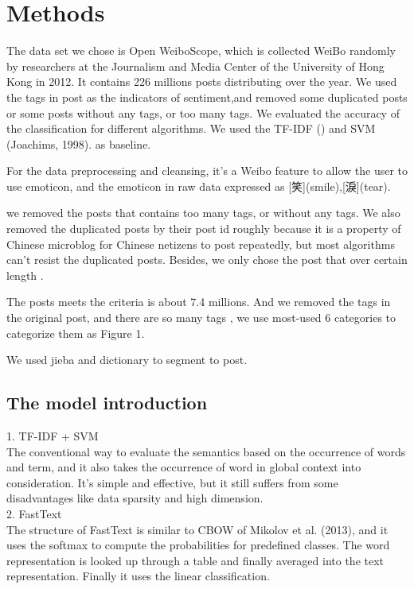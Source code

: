 \chapter{Methods}

The data set we chose is Open WeiboScope, which is collected WeiBo randomly by researchers at the Journalism and Media Center of the University of Hong Kong in 2012. It contains 226 millions posts distributing over the year. We used the tags in post as the indicators of sentiment,and removed some duplicated posts or some posts without any tags, or too many tags. We evaluated the accuracy of the classification for different algorithms.  We used the TF-IDF () and SVM (Joachims, 1998). as baseline.

For the data preprocessing and cleansing, it's a Weibo feature to allow the user to use emoticon, and the emoticon in raw data expressed as [笑](smile),[淚](tear).

we removed the posts that contains too many tags, or without any tags. We also removed the duplicated posts by their post id roughly because it is a property of Chinese microblog \cite{fu2013reality} for Chinese netizens to post repeatedly, but most algorithms can't resist the duplicated posts. Besides, we only chose the post that over certain length .

The posts meets the criteria is about 7.4 millions. And we removed the tags in the original post, and there are so many tags , we use most-used 6 categories to categorize them as Figure 1.

We used jieba and dictionary to segment to post.



\section{The model introduction}

1. TF-IDF + SVM \\

	The conventional way to evaluate the semantics based on the occurrence of words and term, and it also takes the occurrence of word in global context into consideration.  It's simple and effective, but it still suffers from some disadvantages like data sparsity and high dimension. \\
	
2. FastText \cite{joulin2016fasttext}\\
	
	The structure of FastText is similar to CBOW of Mikolov et al. (2013), and it uses the softmax to compute the probabilities for predefined classes. The word representation is looked up through a table and finally averaged into the text representation. Finally it uses the linear classification.

